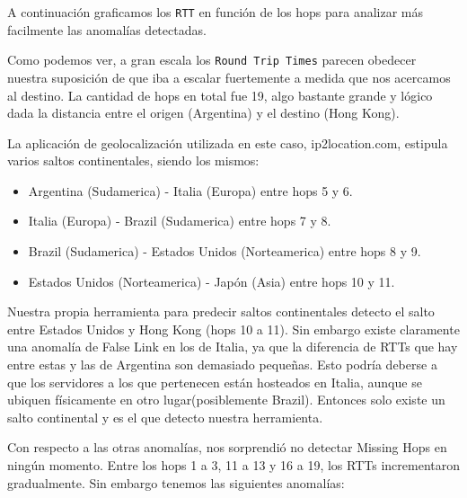 A continuación graficamos los \texttt{RTT} en función de los hops para analizar más facilmente las anomalías detectadas.

\begin{figure}[H]
    \centering
\end{figure}

Como podemos ver, a gran escala los \texttt{Round Trip Times} parecen obedecer nuestra suposición de que iba a escalar fuertemente a medida que nos acercamos al destino. La cantidad de hops en total fue 19, algo bastante grande y lógico dada la distancia entre el origen (Argentina) y el destino (Hong Kong).

La aplicación de geolocalización utilizada en este caso, ip2location.com, estipula varios saltos continentales, siendo los mismos:
\begin{itemize}
\item Argentina (Sudamerica) - Italia (Europa) entre hops 5 y 6.
\item Italia (Europa) - Brazil (Sudamerica) entre hops 7 y 8.
\item Brazil (Sudamerica) - Estados Unidos (Norteamerica) entre hops 8 y 9.
\item Estados Unidos (Norteamerica) - Japón (Asia) entre hops 10 y 11.
\end{itemize}

Nuestra propia herramienta para predecir saltos continentales detecto el salto entre Estados Unidos y Hong Kong (hops 10 a 11). Sin embargo existe claramente
una anomalía de False Link en los de Italia, ya que la diferencia de RTTs que hay entre estas y las de Argentina son demasiado pequeñas. Esto podría deberse
a que los servidores a los que pertenecen están hosteados en Italia, aunque se ubiquen físicamente en otro lugar(posiblemente Brazil). Entonces solo existe
un salto continental y es el que detecto nuestra herramienta.

Con respecto a las otras anomalías, nos sorprendió no detectar Missing Hops en ningún momento. Entre los hops 1 a 3, 11 a 13 y 16 a 19, los RTTs incrementaron gradualmente. Sin embargo tenemos las siguientes anomalías:


